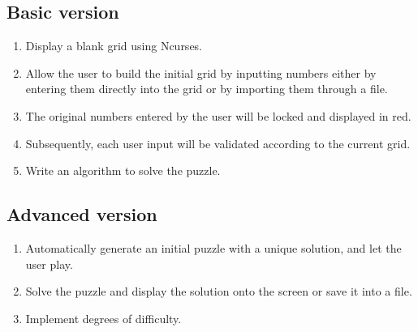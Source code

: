 \documentclass[12pt,letterpaper]{article}
\begin{document}
\subsection{Basic version}

\begin{enumerate}
\item Display a blank grid using Ncurses.

\item Allow the user to build the initial grid by inputting numbers either
  by entering them directly into the grid or by importing them through
  a file.

\item The original numbers entered by the user will be locked and
  displayed in red.

\item Subsequently, each user input will be validated according to the
  current grid.

\item Write an algorithm to solve the puzzle.
\end{enumerate}

\subsection{Advanced version}

\begin{enumerate}

\item Automatically generate an initial puzzle with a unique solution, and
  let the user play.

\item Solve the puzzle and display the solution onto the screen or save it
  into a file.

\item Implement degrees of difficulty.

\end{enumerate}
\end{document}
